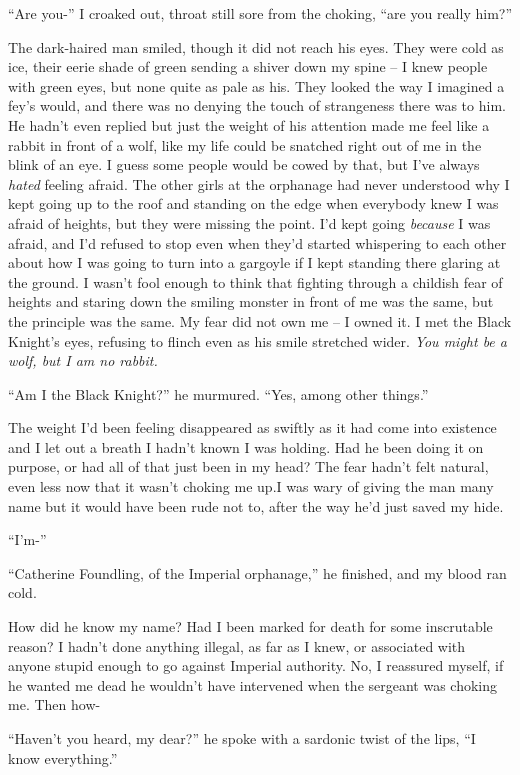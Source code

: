 \documentclass[12pt, openany]{book}
\begin{document}
“Are you-” I croaked out, throat still sore from the choking, “are you really him?”

The dark-haired man smiled, though it did not reach his eyes. They were cold as ice, their eerie shade of green sending a shiver down my spine – I knew people with green eyes, but none quite as pale as his. They looked the way I imagined a fey’s would, and there was no denying the touch of strangeness there was to him. He hadn’t even replied but just the weight of his attention made me feel like a rabbit in front of a wolf, like my life could be snatched right out of me in the blink of an eye. I guess some people would be cowed by that, but I’ve always \textit{hated }feeling afraid. The other girls at the orphanage had never understood why I kept going up to the roof and standing on the edge when everybody knew I was afraid of heights, but they were missing the point. I’d kept going \textit{because }I was afraid, and I’d refused to stop even when they’d started whispering to each other about how I was going to turn into a gargoyle if I kept standing there glaring at the ground. I wasn’t fool enough to think that fighting through a childish fear of heights and staring down the smiling monster in front of me was the same, but the principle was the same. My fear did not own me – I owned it. I met the Black Knight’s eyes, refusing to flinch even as his smile stretched wider. \textit{You might be a wolf, but I am no rabbit.}

“Am I the Black Knight?” he murmured. “Yes, among other things.”

The weight I’d been feeling disappeared as swiftly as it had come into existence and I let out a breath I hadn’t known I was holding. Had he been doing it on purpose, or had all of that just been in my head? The fear hadn’t felt natural, even less now that it wasn’t choking me up.I was wary of giving the man many name but it would have been rude not to, after the way he’d just saved my hide.

“I’m-”

“Catherine Foundling, of the Imperial orphanage,” he finished, and my blood ran cold.

How did he know my name? Had I been marked for death for some inscrutable reason? I hadn’t done anything illegal, as far as I knew, or associated with anyone stupid enough to go against Imperial authority. No, I reassured myself, if he wanted me dead he wouldn’t have intervened when the sergeant was choking me. Then how-

“Haven’t you heard, my dear?” he spoke with a sardonic twist of the lips, “I know everything.”
\end{document}
